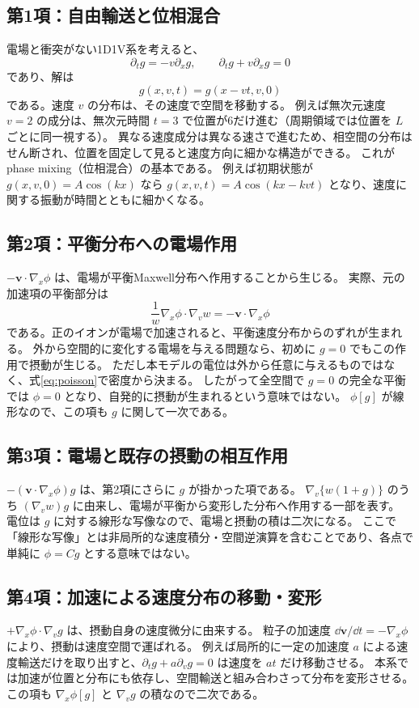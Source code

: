 \subsection{第1項：自由輸送と位相混合}
電場と衝突がない1D1V系を考えると、
\[
\partial_tg=-v\partial_xg,\qquad
\partial_tg+v\partial_xg=0
\]
であり、解は
\[
\boxed{g(x,v,t)=g(x-vt,v,0)}
\]
である。速度 $v$ の分布は、その速度で空間を移動する。
例えば無次元速度 $v=2$ の成分は、無次元時間 $t=3$ で位置が6だけ進む（周期領域では位置を $L$ ごとに同一視する）。
異なる速度成分は異なる速さで進むため、相空間の分布はせん断され、位置を固定して見ると速度方向に細かな構造ができる。
これがphase mixing（位相混合）の基本である。
例えば初期状態が $g(x,v,0)=A\cos(kx)$ なら $g(x,v,t)=A\cos(kx-kvt)$ となり、速度に関する振動が時間とともに細かくなる。

\subsection{第2項：平衡分布への電場作用}
$-\bm v\cdot\nabla_x\phi$ は、電場が平衡Maxwell分布へ作用することから生じる。
実際、元の加速項の平衡部分は
\[
\frac{1}{w}\nabla_x\phi\cdot\nabla_vw=-\bm v\cdot\nabla_x\phi
\]
である。正のイオンが電場で加速されると、平衡速度分布からのずれが生まれる。
外から空間的に変化する電場を与える問題なら、初めに $g=0$ でもこの作用で摂動が生じる。
ただし本モデルの電位は外から任意に与えるものではなく、式\eqref{eq:poisson}で密度から決まる。
したがって全空間で $g=0$ の完全な平衡では $\phi=0$ となり、自発的に摂動が生まれるという意味ではない。
$\phi[g]$ が線形なので、この項も $g$ に関して一次である。

\subsection{第3項：電場と既存の摂動の相互作用}
$-(\bm v\cdot\nabla_x\phi)g$ は、第2項にさらに $g$ が掛かった項である。
$\nabla_v\{w(1+g)\}$ のうち $(\nabla_vw)g$ に由来し、電場が平衡から変形した分布へ作用する一部を表す。
電位は $g$ に対する線形な写像なので、電場と摂動の積は二次になる。
ここで「線形な写像」とは非局所的な速度積分・空間逆演算を含むことであり、各点で単純に $\phi=Cg$ とする意味ではない。

\subsection{第4項：加速による速度分布の移動・変形}
$+\nabla_x\phi\cdot\nabla_vg$ は、摂動自身の速度微分に由来する。
粒子の加速度 $\dd\bm v/\dd t=-\nabla_x\phi$ により、摂動は速度空間で運ばれる。
例えば局所的に一定の加速度 $a$ による速度輸送だけを取り出すと、$\partial_tg+a\partial_vg=0$ は速度を $at$ だけ移動させる。
本系では加速が位置と分布にも依存し、空間輸送と組み合わさって分布を変形させる。
この項も $\nabla_x\phi[g]$ と $\nabla_vg$ の積なので二次である。

